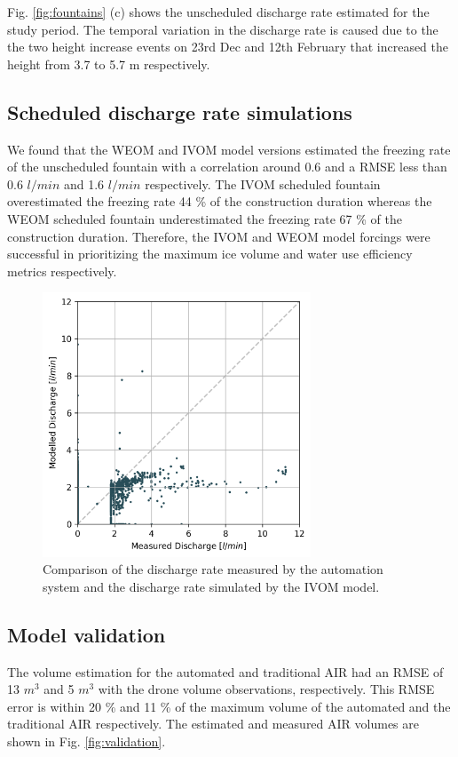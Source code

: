 \documentclass[tc, manuscript]{copernicus}
\begin{document}
Fig. \ref{fig:fountains} (c) shows the unscheduled discharge rate estimated for the study period. The temporal
variation in the discharge rate is caused due to the the two height increase events on 23rd Dec and 12th
February that increased the height from 3.7 to 5.7 m respectively.


\subsection{Scheduled discharge rate simulations}

We found that the WEOM and IVOM model versions estimated the freezing rate of the unscheduled fountain with a
correlation around 0.6 and a RMSE less than 0.6 $l/min$ and 1.6  $l/min$ respectively. The IVOM scheduled
fountain overestimated the freezing rate 44 \% of the construction duration whereas the WEOM scheduled fountain
underestimated the freezing rate 67 \% of the construction duration. Therefore, the IVOM and WEOM model forcings
were successful in prioritizing the maximum ice volume and water use efficiency metrics respectively.

\begin{figure}[t]
\includegraphics[width=8cm]{Figures/simvsreal2.png}

\caption{ Comparison of the discharge rate measured by the automation system and the discharge rate simulated by the IVOM
model. }

\label{fig:simvsreal}
\end{figure}

\subsection{Model validation}

The volume estimation for the automated and traditional AIR had an RMSE of 13 $m^3$ and 5 $m^3$ with the drone
volume observations, respectively. This RMSE error is within 20 \% and 11 \% of the maximum volume of the
automated and the traditional AIR respectively. The estimated and measured AIR volumes are shown in Fig.
\ref{fig:validation}.  
\end{document}
